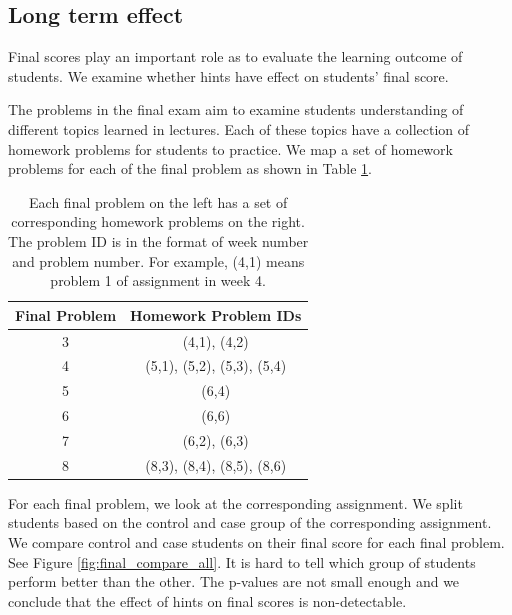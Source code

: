 \documentclass{llncs2e/llncs}
\begin{document}
\subsection{Long term effect}
Final scores play an important role as to evaluate the learning outcome of students. We examine whether hints have effect on students' final score.

The problems in the final exam aim to examine students understanding of different topics learned in lectures. Each of these topics have a collection of homework problems for students to practice. We map a set of homework problems for each of the final problem as shown in Table \ref{tab:map}.

\begin{table}[h]
\caption{Each final problem on the left has a set of corresponding homework problems on the right. The problem ID is in the format of week number and problem number. For example, (4,1) means problem 1 of assignment in week 4.}
\begin{center}
  \begin{tabular}{ c | c }
   Final Problem & Homework Problem IDs \\ \hline
	3 & (4,1), (4,2) \\
	4 & (5,1), (5,2), (5,3), (5,4) \\
    5 & (6,4) \\
    6 & (6,6) \\
    7 & (6,2), (6,3) \\
    8 & (8,3), (8,4), (8,5), (8,6) \\ \hline
  \end{tabular}
  \label{tab:map}
  \end{center}
\end{table}

For each final problem, we look at the corresponding assignment. We split students based on the control and case group of the corresponding assignment. We compare control and case students on their final score for each final problem. See Figure \ref{fig:final_compare_all}. It is hard to tell which group of students perform better than the other. The p-values are not small enough and we conclude that the effect of hints on final scores is non-detectable.
\end{document}
